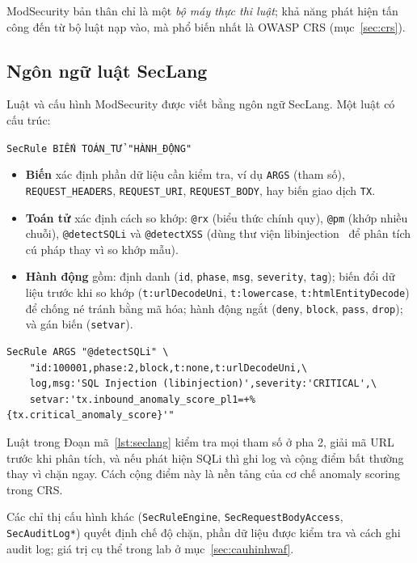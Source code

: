 ModSecurity bản thân chỉ là một \emph{bộ máy thực thi luật}; khả năng phát hiện tấn công đến từ bộ luật nạp vào, mà phổ biến nhất là OWASP CRS (mục~\ref{sec:crs}).

\subsection{Ngôn ngữ luật SecLang}
Luật và cấu hình ModSecurity được viết bằng ngôn ngữ SecLang. Một luật có cấu trúc:
\begin{center}
\texttt{SecRule BIẾN TOÁN\_TỬ "HÀNH\_ĐỘNG"}
\end{center}
\begin{itemize}
  \item \textbf{Biến} xác định phần dữ liệu cần kiểm tra, ví dụ \texttt{ARGS} (tham số), \texttt{REQUEST\_HEADERS}, \texttt{REQUEST\_URI}, \texttt{REQUEST\_BODY}, hay biến giao dịch \texttt{TX}.
  \item \textbf{Toán tử} xác định cách so khớp: \texttt{@rx} (biểu thức chính quy), \texttt{@pm} (khớp nhiều chuỗi), \texttt{@detectSQLi} và \texttt{@detectXSS} (dùng thư viện libinjection~\cite{libinjection} để phân tích cú pháp thay vì so khớp mẫu).
  \item \textbf{Hành động} gồm: định danh (\texttt{id}, \texttt{phase}, \texttt{msg}, \texttt{severity}, \texttt{tag}); biến đổi dữ liệu trước khi so khớp (\texttt{t:urlDecodeUni}, \texttt{t:lowercase}, \texttt{t:htmlEntityDecode}) để chống né tránh bằng mã hóa; hành động ngắt (\texttt{deny}, \texttt{block}, \texttt{pass}, \texttt{drop}); và gán biến (\texttt{setvar}).
\end{itemize}

\begin{lstlisting}[caption={Một luật SecLang phát hiện SQLi bằng libinjection},label={lst:seclang}]
SecRule ARGS "@detectSQLi" \
    "id:100001,phase:2,block,t:none,t:urlDecodeUni,\
    log,msg:'SQL Injection (libinjection)',severity:'CRITICAL',\
    setvar:'tx.inbound_anomaly_score_pl1=+%{tx.critical_anomaly_score}'"
\end{lstlisting}

Luật trong Đoạn mã~\ref{lst:seclang} kiểm tra mọi tham số ở pha 2, giải mã URL trước khi phân tích, và nếu phát hiện SQLi thì ghi log và cộng điểm bất thường thay vì chặn ngay. Cách cộng điểm này là nền tảng của cơ chế anomaly scoring trong CRS.

Các chỉ thị cấu hình khác (\texttt{SecRuleEngine}, \texttt{SecRequestBodyAccess}, \texttt{SecAuditLog*}) quyết định chế độ chặn, phần dữ liệu được kiểm tra và cách ghi audit log; giá trị cụ thể trong lab ở mục~\ref{sec:cauhinhwaf}.

